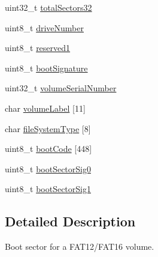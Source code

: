 \begin{DoxyCompactItemize}
\item 
uint32\-\_\-t \hyperlink{structfat__boot_a64d5902f9e900ecc745b1c0b325d875f}{total\-Sectors32}
\item 
uint8\-\_\-t \hyperlink{structfat__boot_aa7c65fdb4f759fca094105d1c870bcb2}{drive\-Number}
\item 
uint8\-\_\-t \hyperlink{structfat__boot_a2a2556147677ece60b8aadf4a0d608ed}{reserved1}
\item 
uint8\-\_\-t \hyperlink{structfat__boot_acc4a4e4c22b630d12c1b2c2b8c7eb366}{boot\-Signature}
\item 
uint32\-\_\-t \hyperlink{structfat__boot_a7c9ffcee12051cefe1724e8024af25f8}{volume\-Serial\-Number}
\item 
char \hyperlink{structfat__boot_a253960050a38d2bfb2f57e86769aca62}{volume\-Label} \mbox{[}11\mbox{]}
\item 
char \hyperlink{structfat__boot_adf80bb044ef7c8ac6d371268aa338e23}{file\-System\-Type} \mbox{[}8\mbox{]}
\item 
uint8\-\_\-t \hyperlink{structfat__boot_a3a3b1f80267552c92749bd86827821a2}{boot\-Code} \mbox{[}448\mbox{]}
\item 
uint8\-\_\-t \hyperlink{structfat__boot_abdaf2cc75b74800944ede557442ca5bd}{boot\-Sector\-Sig0}
\item 
uint8\-\_\-t \hyperlink{structfat__boot_a44983e94ecddbdcb7ab691e493a13d94}{boot\-Sector\-Sig1}
\end{DoxyCompactItemize}


\subsection{Detailed Description}
Boot sector for a F\-A\-T12/\-F\-A\-T16 volume. 

